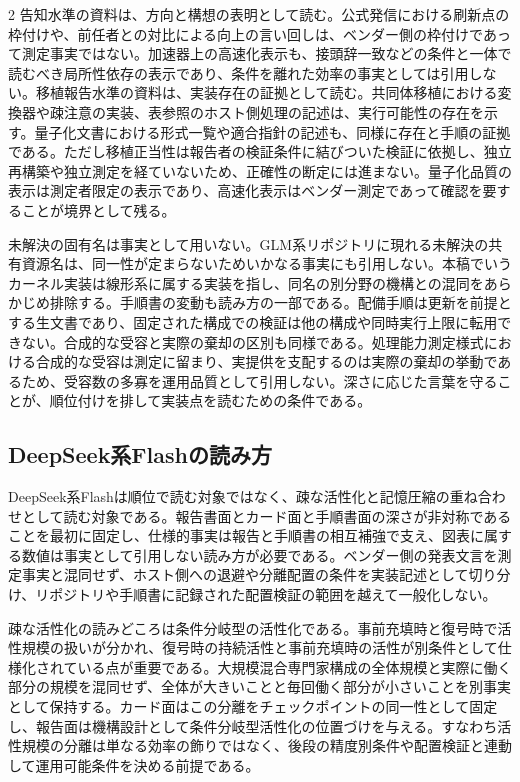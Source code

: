 \documentclass[lualatex,a4paper,10pt]{jlreq}
\begin{document}
\begin{multicols}{2}
告知水準の資料は、方向と構想の表明として読む。公式発信における刷新点の枠付けや、前任者との対比による向上の言い回しは、ベンダー側の枠付けであって測定事実ではない\autocite{qwenblog}\autocite{nvblogqwen}\autocite{dsadebut}。加速器上の高速化表示も、接頭辞一致などの条件と一体で読むべき局所性依存の表示であり、条件を離れた効率の事実としては引用しない。移植報告水準の資料は、実装存在の証拠として読む。共同体移植における変換器や疎注意の実装、表参照のホスト側処理の記述は、実行可能性の存在を示す\autocite{qwenpr}\autocite{qwen38repo}。量子化文書における形式一覧や適合指針の記述も、同様に存在と手順の証拠である\autocite{unslothglm}\autocite{kimigithub}\autocite{kda}。ただし移植正当性は報告者の検証条件に結びついた検証に依拠し、独立再構築や独立測定を経ていないため、正確性の断定には進まない。量子化品質の表示は測定者限定の表示であり、高速化表示はベンダー測定であって確認を要することが境界として残る。

未解決の固有名は事実として用いない。GLM系リポジトリに現れる未解決の共有資源名は、同一性が定まらないためいかなる事実にも引用しない\autocite{glm5github}。本稿でいうカーネル実装は線形系に属する実装を指し、同名の別分野の機構との混同をあらかじめ排除する\autocite{kda}\autocite{kimigithub}。手順書の変動も読み方の一部である。配備手順は更新を前提とする生文書であり、固定された構成での検証は他の構成や同時実行上限に転用できない\autocite{vllmrecipe}\autocite{dynamo}。合成的な受容と実際の棄却の区別も同様である。処理能力測定様式における合成的な受容は測定に留まり、実提供を支配するのは実際の棄却の挙動であるため、受容数の多寡を運用品質として引用しない\autocite{vllmrecipe}\autocite{dspark}。深さに応じた言葉を守ることが、順位付けを排して実装点を読むための条件である。

\subsection{DeepSeek系Flashの読み方}
DeepSeek系Flashは順位で読む対象ではなく、疎な活性化と記憶圧縮の重ね合わせとして読む対象である。報告書面とカード面と手順書面の深さが非対称であることを最初に固定し、仕様的事実は報告と手順書の相互補強で支え、図表に属する数値は事実として引用しない読み方が必要である\autocite{v41report}\autocite{v41card}。ベンダー側の発表文言を測定事実と混同せず、ホスト側への退避や分離配置の条件を実装記述として切り分け、リポジトリや手順書に記録された配置検証の範囲を越えて一般化しない\autocite{dynamo}\autocite{vllmrecipe}。

疎な活性化の読みどころは条件分岐型の活性化である。事前充填時と復号時で活性規模の扱いが分かれ、復号時の持続活性と事前充填時の活性が別条件として仕様化されている点が重要である\autocite{v41report}\autocite{v41card}。大規模混合専門家構成の全体規模と実際に働く部分の規模を混同せず、全体が大きいことと毎回働く部分が小さいことを別事実として保持する。カード面はこの分離をチェックポイントの同一性として固定し、報告面は機構設計として条件分岐型活性化の位置づけを与える。すなわち活性規模の分離は単なる効率の飾りではなく、後段の精度別条件や配置検証と連動して運用可能条件を決める前提である。


\end{multicols}
\end{document}

